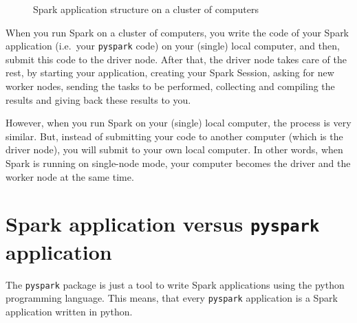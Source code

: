 \documentclass[
  11pt,
  letterpaper,
  DIV=11,
  numbers=noendperiod]{scrreprt}
\begin{document}
\begin{figure}


\caption{\label{fig-spark-application}Spark application structure on a
cluster of computers}

\end{figure}%

When you run Spark on a cluster of computers, you write the code of your
Spark application (i.e.~your \texttt{pyspark} code) on your (single)
local computer, and then, submit this code to the driver node. After
that, the driver node takes care of the rest, by starting your
application, creating your Spark Session, asking for new worker nodes,
sending the tasks to be performed, collecting and compiling the results
and giving back these results to you.

However, when you run Spark on your (single) local computer, the process
is very similar. But, instead of submitting your code to another
computer (which is the driver node), you will submit to your own local
computer. In other words, when Spark is running on single-node mode,
your computer becomes the driver and the worker node at the same time.

\section{\texorpdfstring{Spark application versus \texttt{pyspark}
application}{Spark application versus pyspark application}}\label{spark-application-versus-pyspark-application}

The \texttt{pyspark} package is just a tool to write Spark applications
using the python programming language. This means, that every
\texttt{pyspark} application is a Spark application written in python.
\end{document}
